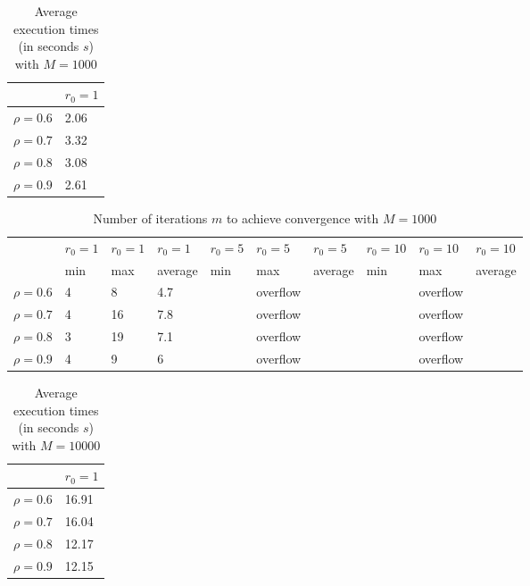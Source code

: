 \documentclass[a4paper,11pt,openright]{report}
\begin{document}
\begin{table}[H]
\centering
\addtolength{\leftskip}{-1.5cm}
\addtolength{\rightskip}{-1.5cm}
\begin{tabular}{|c|l|}
\hline
$ $ & $r_0 = 1$  \\
\hline
$\rho = 0.6$ & 2.06  \\

$\rho = 0.7$ & 3.32  \\

$\rho = 0.8$ & 3.08  \\

$\rho = 0.9$ & 2.61  \\
\hline
\end{tabular}
\caption{Average execution
 times (in seconds $s$) with $M = 1000$}
\end{table}
\begin{table}[H]
\centering
\addtolength{\leftskip}{-1.5cm}
\addtolength{\rightskip}{-1.5cm}
\begin{tabular}{|c|lllllllll|}
\hline
$ $ & $r_0 = 1$ & $r_0 = 1$ & $r_0 = 1$ & $r_0 = 5$ & $r_0 = 5$ & $r_0 = 5$ & $r_0 = 10$ & $r_0 = 10$ & $r_0 = 10$  \\
$ $ & min & max & average & min & max & average & min & max & average \\ 
\hline
$\rho = 0.6$ & 4 & 8 & 4.7 &  & overflow &  &  & overflow &  \\

$\rho = 0.7$ & 4 & 16 & 7.8 &  & overflow &  &  & overflow &  \\

$\rho = 0.8$ & 3 & 19 & 7.1 &  & overflow &  &  & overflow & \\

$\rho = 0.9$ & 4 & 9 & 6 &  & overflow &  &  & overflow & \\
\hline
\end{tabular}
\caption{Number of iterations $m$ to achieve convergence with $M = 1000$}
\end{table}
\begin{table}[H]
\centering
\addtolength{\leftskip}{-1.5cm}
\addtolength{\rightskip}{-1.5cm}
\begin{tabular}{|c|l|}
\hline
$ $ & $r_0 = 1$   \\
\hline
$\rho = 0.6$ & 16.91  \\

$\rho = 0.7$ & 16.04  \\

$\rho = 0.8$ & 12.17  \\

$\rho = 0.9$ & 12.15  \\
\hline
\end{tabular}
\caption{Average execution
 times (in seconds $s$) with $M = 10000$}
\end{table}
\end{document}

